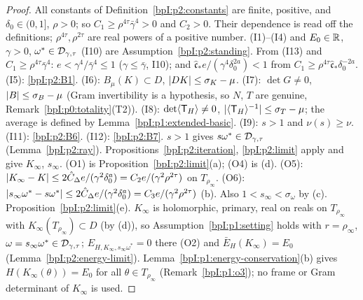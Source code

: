 \begin{proof}
\label{stepI:p2:g1-constants}
All constants of Definition~\ref{bpI:p2:constants} are finite, positive, and $\delta_0\in(0,1]$, $\rho>0$; so $C_1\ge\rho^{4\tau}\bar\gamma^4>0$ and $C_2>0$. Their dependence is read off the definitions; $\rho^{4\tau},\rho^{2\tau}$ are real powers of a positive number.
\label{stepI:p2:g1-standing}
(I1)--(I4) and $E_0\in\mathbb{R}$, $\gamma>0$, $\omega^*\in\mathcal{D}_{\gamma,\tau}$ (I10) are Assumption~\ref{bpI:p2:standing}.
\label{stepI:p2:g1-e}
From (I13) and $C_1\ge\rho^{4\tau}\bar\gamma^4$: $e<\gamma^4/\bar\gamma^4\le1$ ($\gamma\le\bar\gamma$, I10); and $\hat{\mathfrak c}_*e/(\gamma^4\delta_0^{2a})<1$ from $C_1\ge\rho^{4\tau}\hat{\mathfrak c}_*\delta_0^{-2a}$.
\label{stepI:p2:g1-dict}
(I5): \ref{bpI:p2:B1}. (I6): $B_\mu(K)\subset D$, $\lvert DK\rvert\le\sigma_K-\mu$. (I7): $\det G\ne0$, $\lvert B\rvert\le\sigma_B-\mu$ (Gram invertibility is a hypothesis, so $N$, $T$ are genuine, Remark~\ref{bpI:p0:totality}(T2)). (I8): $\det\langle \mathsf T_H\rangle\ne0$, $\lvert \langle \mathsf T_H\rangle^{-1}\rvert\le\sigma_T-\mu$; the average is defined by Lemma~\ref{bpI:p1:extended-basic}. (I9): $s>1$ and $\nu(s)\ge\nu$. (I11): \ref{bpI:p2:B6}. (I12): \ref{bpI:p2:B7}. $s>1$ gives $s\omega^*\in\mathcal{D}_{\gamma,\tau}$ (Lemma~\ref{bpI:p2:ray}).
\label{stepI:p2:g1-apply}
Propositions~\ref{bpI:p2:iteration}, \ref{bpI:p2:limit} apply and give $K_\infty$, $s_\infty$.
\label{stepI:p2:g1-o}
(O1) is Proposition~\ref{bpI:p2:limit}(a); (O4) is (d). (O5): $\lvert K_\infty-K\rvert\le2\hat C_\Delta e/(\gamma^2\delta_0^a)=C_2e/(\gamma^2\rho^{2\tau})$ on $T_{\rho_\infty}$. (O6): $\lvert s_\infty\omega^*-s\omega^*\rvert\le2\hat C_\Delta e/(\gamma^2\delta_0^a)=C_3e/(\gamma^2\rho^{2\tau})$ (b). Also $1<s_\infty<\sigma_\omega$ by (c).
\label{stepI:p2:g1-o2}
Proposition~\ref{bpI:p2:limit}(e).
\label{stepI:p2:g1-o3}
$K_\infty$ is holomorphic, primary, real on reals on $T_{\rho_\infty}$ with $K_\infty(T_{\rho_\infty})\subset D$ (by (d)), so Assumption~\ref{bpI:p1:setting} holds with $r=\rho_\infty$, $\omega=s_\infty\omega^*\in\mathcal{D}_{\gamma,\tau}$; $E_{H,K_\infty,s_\infty\omega^*}=0$ there (O2) and $\bar E_H(K_\infty)=E_0$ (Lemma~\ref{bpI:p2:energy-limit}). Lemma~\ref{bpI:p1:energy-conservation}(b) gives $H(K_\infty(\theta))=E_0$ for all $\theta\in T_{\rho_\infty}$ (Remark~\ref{bpI:p1:o3}); no frame or Gram determinant of $K_\infty$ is used.
\end{proof}

